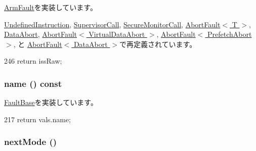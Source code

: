 \hyperlink{classArmISA_1_1ArmFault_a12a2298da9af24c62275dac1cf76a888}{ArmFault}を実装しています。

\hyperlink{classArmISA_1_1UndefinedInstruction_a54f4d33ac162a95fd5b3830cf7fab8ff}{UndefinedInstruction}, \hyperlink{classArmISA_1_1SupervisorCall_a54f4d33ac162a95fd5b3830cf7fab8ff}{SupervisorCall}, \hyperlink{classArmISA_1_1SecureMonitorCall_a54f4d33ac162a95fd5b3830cf7fab8ff}{SecureMonitorCall}, \hyperlink{classArmISA_1_1AbortFault_a54f4d33ac162a95fd5b3830cf7fab8ff}{AbortFault$<$ T $>$}, \hyperlink{classArmISA_1_1DataAbort_a54f4d33ac162a95fd5b3830cf7fab8ff}{DataAbort}, \hyperlink{classArmISA_1_1AbortFault_a54f4d33ac162a95fd5b3830cf7fab8ff}{AbortFault$<$ VirtualDataAbort $>$}, \hyperlink{classArmISA_1_1AbortFault_a54f4d33ac162a95fd5b3830cf7fab8ff}{AbortFault$<$ PrefetchAbort $>$}, と \hyperlink{classArmISA_1_1AbortFault_a54f4d33ac162a95fd5b3830cf7fab8ff}{AbortFault$<$ DataAbort $>$}で再定義されています。


\begin{DoxyCode}
246 { return issRaw; }
\end{DoxyCode}
\hypertarget{classArmISA_1_1ArmFaultVals_a73adb23259baf912a81683a9790a303f}{
\subsubsection[{name}]{ name () const}}
\label{classArmISA_1_1ArmFaultVals_a73adb23259baf912a81683a9790a303f}


\hyperlink{classFaultBase_aad960357563b8b969d2dffdcc6861de7}{FaultBase}を実装しています。


\begin{DoxyCode}
217 { return vals.name; }
\end{DoxyCode}
\hypertarget{classArmISA_1_1ArmFaultVals_a5bddc2d174b417a7f918e873cd12ba2a}{
\subsubsection[{nextMode}]{ nextMode ()}}
\label{classArmISA_1_1ArmFaultVals_a5bddc2d174b417a7f918e873cd12ba2a}


